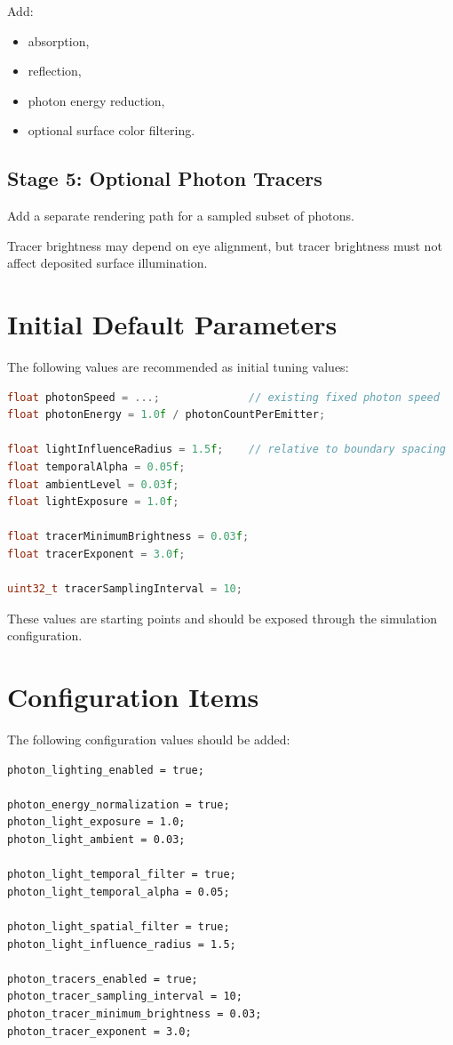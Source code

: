 \documentclass[11pt]{article}
\begin{document}
Add:

\begin{itemize}
    \item absorption,
    \item reflection,
    \item photon energy reduction,
    \item optional surface color filtering.
\end{itemize}

\subsection{Stage 5: Optional Photon Tracers}

Add a separate rendering path for a sampled subset of photons.

Tracer brightness may depend on eye alignment, but tracer brightness must not
affect deposited surface illumination.

\section{Initial Default Parameters}

The following values are recommended as initial tuning values:

\begin{lstlisting}[language=C++]
float photonSpeed = ...;              // existing fixed photon speed
float photonEnergy = 1.0f / photonCountPerEmitter;

float lightInfluenceRadius = 1.5f;    // relative to boundary spacing
float temporalAlpha = 0.05f;
float ambientLevel = 0.03f;
float lightExposure = 1.0f;

float tracerMinimumBrightness = 0.03f;
float tracerExponent = 3.0f;

uint32_t tracerSamplingInterval = 10;
\end{lstlisting}

These values are starting points and should be exposed through the simulation
configuration.

\section{Configuration Items}

The following configuration values should be added:

\begin{lstlisting}
photon_lighting_enabled = true;

photon_energy_normalization = true;
photon_light_exposure = 1.0;
photon_light_ambient = 0.03;

photon_light_temporal_filter = true;
photon_light_temporal_alpha = 0.05;

photon_light_spatial_filter = true;
photon_light_influence_radius = 1.5;

photon_tracers_enabled = true;
photon_tracer_sampling_interval = 10;
photon_tracer_minimum_brightness = 0.03;
photon_tracer_exponent = 3.0;
\end{lstlisting}
\end{document}
